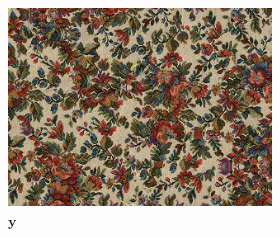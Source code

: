 \begin{figure}[ht]
    \centering    
    \begin{subfigure}{\textwidth}
        \centering
        \begin{subfigure}{0.3\textwidth}
            \centering
            \includegraphics[width=\textwidth]{images/01-results_teaser-target.jpg}
            \caption{\(\bm{y}\)}
            \label{fig:intro_results_teaser_target}
        \end{subfigure}
        \hfill
        \begin{subfigure}{0.3\textwidth}
            \centering
\end{subfigure}
\end{subfigure}
\end{figure}
